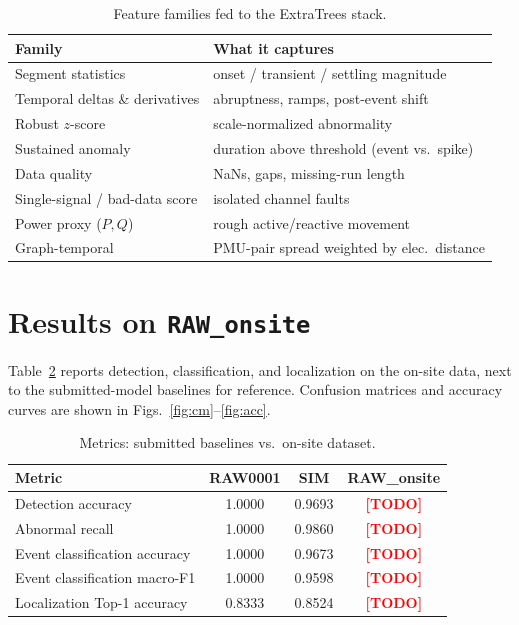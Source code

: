 \documentclass[conference]{IEEEtran}
\newcommand{\TODO}{\textcolor{red}{\textbf{[TODO]}}}
\newcommand{\DSname}{RAW\_onsite}        %
\newcommand{\NewDetAcc}{\TODO}
\newcommand{\NewAbnRec}{\TODO}
\newcommand{\NewClsAcc}{\TODO}
\newcommand{\NewMacroF}{\TODO}
\newcommand{\NewLocTop}{\TODO}
\begin{document}
\begin{table}[t]
\centering
\caption{Feature families fed to the ExtraTrees stack.}
\label{tab:feat}
\renewcommand{\arraystretch}{1.05}
\footnotesize
\begin{tabular}{@{}ll@{}}
\toprule
\textbf{Family} & \textbf{What it captures} \\
\midrule
Segment statistics & onset / transient / settling magnitude \\
Temporal deltas \& derivatives & abruptness, ramps, post-event shift \\
Robust $z$-score & scale-normalized abnormality \\
Sustained anomaly & duration above threshold (event vs.\ spike) \\
Data quality & NaNs, gaps, missing-run length \\
Single-signal / bad-data score & isolated channel faults \\
Power proxy ($P,Q$) & rough active/reactive movement \\
Graph-temporal & PMU-pair spread weighted by elec.\ distance \\
\bottomrule
\end{tabular}
\end{table}

\section{Results on \texttt{\DSname}}
Table~\ref{tab:res} reports detection, classification, and localization on the
on-site data, next to the submitted-model baselines for reference. Confusion
matrices and accuracy curves are shown in
Figs.~\ref{fig:cm}--\ref{fig:acc}.

\begin{table}[t]
\centering
\caption{Metrics: submitted baselines vs.\ on-site dataset.}
\label{tab:res}
\renewcommand{\arraystretch}{1.15}
\footnotesize
\begin{tabular}{@{}lccc@{}}
\toprule
\textbf{Metric} & \textbf{RAW0001} & \textbf{SIM} & \textbf{\DSname} \\
\midrule
Detection accuracy            & 1.0000 & 0.9693 & \NewDetAcc \\
Abnormal recall               & 1.0000 & 0.9860 & \NewAbnRec \\
Event classification accuracy & 1.0000 & 0.9673 & \NewClsAcc \\
Event classification macro-F1 & 1.0000 & 0.9598 & \NewMacroF \\
Localization Top-1 accuracy   & 0.8333 & 0.8524 & \NewLocTop \\
\bottomrule
\end{tabular}
\end{table}
\end{document}
